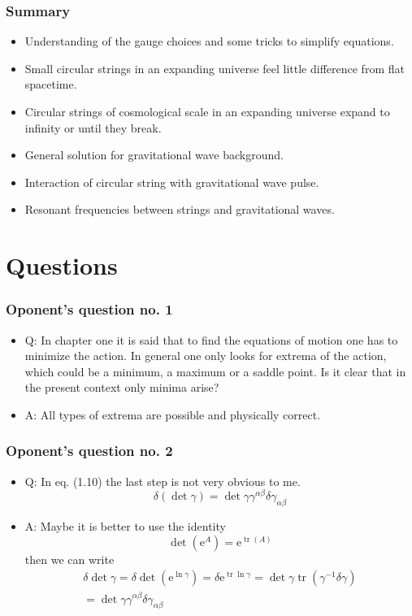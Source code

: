 \documentclass[11pt]{beamer}
\DeclareMathOperator{\tr}{\operatorname{tr}}
\newcommand{\me}{\mathrm{e}}
\newcommand{\lp}{\left(}
\newcommand{\rp}{\right)}
\begin{document}
\begin{frame}
	\frametitle{Summary}
	\begin{itemize}
		\item Understanding of the gauge choices and some tricks to simplify equations.
		\item Small circular strings in an expanding universe feel little difference from flat spacetime.
		\item Circular strings of cosmological scale in an expanding universe expand to infinity or until they break.
		\item General solution for gravitational wave background.
		\item Interaction of circular string with gravitational wave pulse.
		\item Resonant frequencies between strings and gravitational waves.
	\end{itemize}
\end{frame}

\appendix

\section{Questions}

\begin{frame}
	\frametitle{Oponent's question no. 1}
	\begin{itemize}
		\item 
		Q: In chapter one it is said that to find the equations of motion one has to minimize
		the action. In general one only looks for extrema of the action, which could be a
		minimum, a maximum or a saddle point. Is it clear that in the present context only
		minima arise?
		
		\item A: All types of extrema are possible and physically correct.
	\end{itemize}			
\end{frame}


\begin{frame}
	\frametitle{Oponent's question no. 2}
	\begin{itemize}
		\item Q: In eq. (1.10) the last step is not very obvious to me.
		$$
		\delta (\det \gamma) = \det \gamma \gamma^{\alpha \beta} \delta \gamma_{\alpha \beta} 
		$$
		\item A: Maybe it is better to use the identity
		$$
		\det \lp \me^{A} \rp = \me^{\tr (A)}
		$$
		then we can write
		$$
		\begin{aligned}
		\delta \det \gamma = \delta \det \lp \me^{\ln \gamma} \rp = \delta \me^{\tr \ln \gamma} = \det \gamma \tr \lp \gamma^{-1} \delta \gamma \rp \\
		 = \det \gamma \gamma^{\alpha \beta} \delta \gamma_{\alpha \beta}
		\end{aligned}
		$$
	\end{itemize}
\end{frame}
\end{document}
